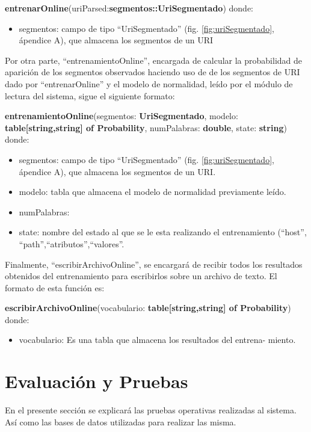 \textbf{entrenarOnline}(uriParsed:\textbf{segmentos::UriSegmentado})
donde:

\begin{itemize}
\item segmentos: campo de tipo ``UriSegmentado'' (fig. \ref{fig:uriSegmentado}, ápendice A), que almacena
los segmentos de un URI
\end{itemize}

Por otra parte, ``entrenamientoOnline'', encargada de calcular la probabilidad de aparición de los segmentos observados haciendo uso de de los segmentos de URI dado por ``entrenarOnline'' y el modelo de normalidad, leído por el módulo de lectura del sistema, sigue el siguiente formato:

\textbf{entrenamientoOnline}(segmentos: \textbf{UriSegmentado},
modelo: \textbf{table[string,string] of Probability}, numPalabras: \textbf{double}, state: \textbf{string})
donde:
\begin{itemize}
\item segmentos: campo de tipo ``UriSegmentado'' (fig. \ref{fig:uriSegmentado}, ápendice A), que almacena los segmentos de un URI.
\item modelo: tabla que almacena el modelo de normalidad previamente
leído.
\item numPalabras:
\item state: nombre del estado al que se le esta realizando el entrenamiento
(``host'',\\``path'',``atributos'',``valores''.
\end{itemize}

Finalmente, ``escribirArchivoOnline'', se encargará de recibir todos los
resultados obtenidos del entrenamiento para escribirlos sobre un archivo de
texto. El formato de esta función es:

\textbf{escribirArchivoOnline}(vocabulario: \textbf{table[string,string] of Probability})
donde:
\begin{itemize}
\item vocabulario: Es una tabla que almacena los resultados del entrena-
miento.
\end{itemize}


\section{Evaluación y Pruebas}

En el presente sección se explicará las pruebas operativas
realizadas al sistema. Así como las bases de datos utilizadas para realizar
las misma.

